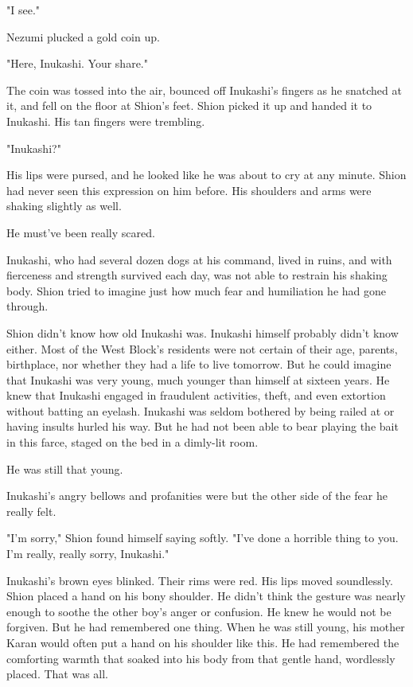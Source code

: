 "I see."

Nezumi plucked a gold coin up.

"Here, Inukashi. Your share."

The coin was tossed into the air, bounced off Inukashi's fingers as he
snatched at it, and fell on the floor at Shion's feet. Shion picked it
up and handed it to Inukashi. His tan fingers were trembling.

"Inukashi?"

His lips were pursed, and he looked like he was about to cry at any
minute. Shion had never seen this expression on him before. His
shoulders and arms were shaking slightly as well.

He must've been really scared.

Inukashi, who had several dozen dogs at his command, lived in ruins, and
with fierceness and strength survived each day, was not able to restrain
his shaking body. Shion tried to imagine just how much fear and
humiliation he had gone through.

Shion didn't know how old Inukashi was. Inukashi himself probably didn't
know either. Most of the West Block's residents were not certain of
their age, parents, birthplace, nor whether they had a life to live
tomorrow. But he could imagine that Inukashi was very young, much
younger than himself at sixteen years. He knew that Inukashi engaged in
fraudulent activities, theft, and even extortion without batting an
eyelash. Inukashi was seldom bothered by being railed at or having
insults hurled his way. But he had not been able to bear playing the
bait in this farce, staged on the bed in a dimly-lit room.

He was still that young.

Inukashi's angry bellows and profanities were but the other side of the
fear he really felt.

"I'm sorry," Shion found himself saying softly. "I've done a horrible
thing to you. I'm really, really sorry, Inukashi."

Inukashi's brown eyes blinked. Their rims were red. His lips moved
soundlessly. Shion placed a hand on his bony shoulder. He didn't think
the gesture was nearly enough to soothe the other boy's anger or
confusion. He knew he would not be forgiven. But he had remembered one
thing. When he was still young, his mother Karan would often put a hand
on his shoulder like this. He had remembered the comforting warmth that
soaked into his body from that gentle hand, wordlessly placed. That was
all.

